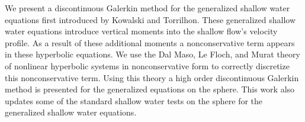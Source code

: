 
We present a discontinuous Galerkin method for the generalized shallow water equations first introduced by Kowalski and Torrilhon.
These generalized shallow water equations introduce vertical moments into the shallow flow's velocity profile.
As a result of these additional moments a nonconservative term appears in these hyperbolic equations.
We use the Dal Maso, Le Floch, and Murat theory of nonlinear hyperbolic systems in nonconservative form to correctly discretize this nonconservative term.
Using this theory a high order discontinuous Galerkin method is presented for the generalized equations on the sphere.
This work also updates some of the standard shallow water tests on the sphere for the generalized shallow water equations.
